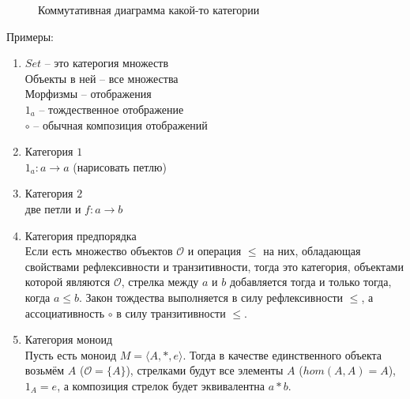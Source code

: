 \documentclass[a4paper, fleqn, draft]{report}
\begin{document}
\begin{figure}
  \centering

  \caption{Коммутативная диаграмма какой-то категории}
  \label{fig:cd1}
\end{figure}
Примеры:
\begin{enumerate}
  \item $Set$ -- это катерогия множеств \\
    Объекты в ней -- все множества \\
    Морфизмы -- отображения \\
    $1_a$ -- тождественное отображение \\
    $\circ$ -- обычная композиция отображений
  \item Категория $1$ \\
    $1_a\colon a \to a$ (нарисовать петлю)
  \item Категория $2$ \\
    две петли и $f\colon a \to b$
  \item Категория предпорядка \\
    Если есть множество объектов $\mathcal{O}$ и операция $\leq$ на них,
    обладающая свойствами рефлексивности и транзитивности, тогда это категория,
    объектами которой являются $\mathcal{O}$, стрелка между $a$ и $b$
    добавляется тогда и только тогда, когда $a \leq b$. Закон тождества
    выполняется в силу рефлексивности $\leq$, а ассоциативность $\circ$ в силу
    транзитивности $\leq$.
  \item Категория моноид \\
    Пусть есть моноид $M = \langle A, *, e \rangle$. Тогда в качестве
    единственного объекта возьмём $A$ ($\mathcal{O} = \{ A \}$),
    стрелками будут все элементы $A$ ($hom(A, A) = A$), $1_A = e$, а композиция
    стрелок будет эквивалентна $a * b$.
\end{enumerate}
\end{document}
